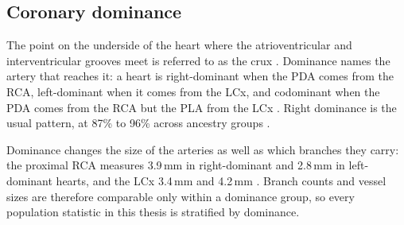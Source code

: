 \subsection{Coronary dominance}
\label{sec:dominance}

The point on the underside of the heart where the atrioventricular and interventricular grooves meet is referred to as the crux \cite{allwork1987applied}.
Dominance names the artery that reaches it: a heart is right-dominant when the PDA comes from the RCA, left-dominant when it comes from the LCx, and codominant when the PDA comes from the RCA but the PLA from the LCx \cite{devos2024coronary,allwork1987applied}.
Right dominance is the usual pattern, at 87\% to 96\% across ancestry groups \cite{ihdayhid2021ethnic}.

Dominance changes the size of the arteries as well as which branches they carry: the proximal RCA measures 3.9\,mm in right-dominant and 2.8\,mm in left-dominant hearts, and the LCx 3.4\,mm and 4.2\,mm \cite{dodge1992diameter}.
Branch counts and vessel sizes are therefore comparable only within a dominance group, so every population statistic in this thesis is stratified by dominance.
